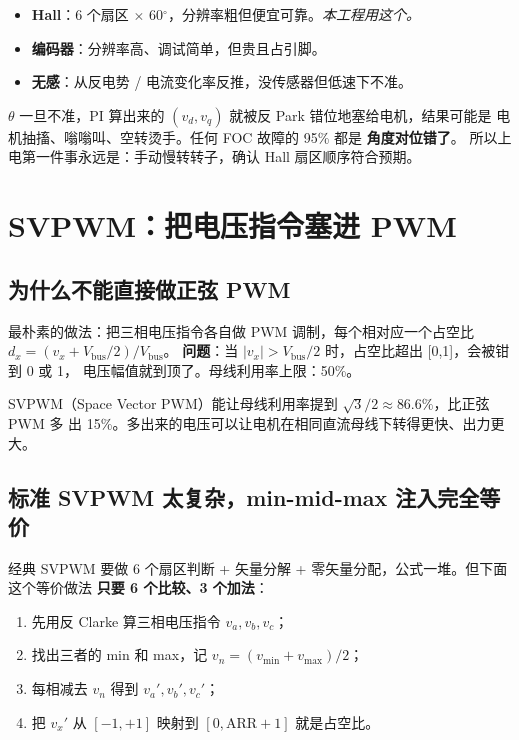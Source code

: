 \documentclass[UTF8,a4paper,11pt]{ctexart}
\begin{document}
\begin{itemize}
  \item \textbf{Hall}：6 个扇区 $\times$ 60$^\circ$，分辨率粗但便宜可靠。\emph{本工程用这个。}
  \item \textbf{编码器}：分辨率高、调试简单，但贵且占引脚。
  \item \textbf{无感}：从反电势 / 电流变化率反推，没传感器但低速下不准。
\end{itemize}

\begin{trap}
$\theta$ 一旦不准，PI 算出来的 $(v_d, v_q)$ 就被反 Park 错位地塞给电机，结果可能是
电机抽搐、嗡嗡叫、空转烫手。任何 FOC 故障的 95\% 都是 \textbf{角度对位错了}。
所以上电第一件事永远是：手动慢转转子，确认 Hall 扇区顺序符合预期。
\end{trap}

\section{SVPWM：把电压指令塞进 PWM}

\subsection{为什么不能直接做正弦 PWM}

最朴素的做法：把三相电压指令各自做 PWM 调制，每个相对应一个占空比 $d_x = (v_x + V_\text{bus}/2)/V_\text{bus}$。
\textbf{问题}：当 $|v_x| > V_\text{bus}/2$ 时，占空比超出 [0,1]，会被钳到 0 或 1，
电压幅值就到顶了。母线利用率上限：50\%。

SVPWM（Space Vector PWM）能让母线利用率提到 $\sqrt{3}/2 \approx 86.6\%$，比正弦 PWM 多
出 15\%。多出来的电压可以让电机在相同直流母线下转得更快、出力更大。

\subsection{标准 SVPWM 太复杂，min-mid-max 注入完全等价}

经典 SVPWM 要做 6 个扇区判断 + 矢量分解 + 零矢量分配，公式一堆。但下面这个等价做法
\textbf{只要 6 个比较、3 个加法}：

\begin{enumerate}
  \item 先用反 Clarke 算三相电压指令 $v_a, v_b, v_c$；
  \item 找出三者的 min 和 max，记 $v_n = (v_\text{min} + v_\text{max})/2$；
  \item 每相减去 $v_n$ 得到 $v_a', v_b', v_c'$；
  \item 把 $v_x'$ 从 $[-1, +1]$ 映射到 $[0, \text{ARR}+1]$ 就是占空比。
\end{enumerate}
\end{document}
